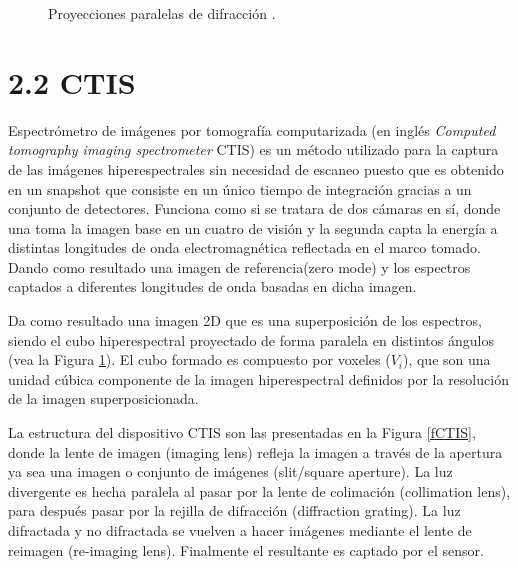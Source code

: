 \begin{figure}[h]
  \centering
  \centering
  \caption{Proyecciones paralelas de difracción \cite{PracCam}.}
  \label{fPaper1}
\end{figure}

\section{2.2 CTIS}
\label{CTIS}
Espectrómetro de imágenes por tomografía computarizada (en inglés \textit{Computed tomography imaging spectrometer} CTIS) es un método utilizado para la captura de las imágenes hiperespectrales sin necesidad de escaneo puesto que es obtenido en un snapshot que consiste en un único tiempo de integración gracias a un conjunto de detectores. 
Funciona como si se tratara de dos cámaras en sí, donde una toma la imagen base en un cuatro de visión y la segunda capta la energía a distintas longitudes de onda electromagnética reflectada en el marco tomado.
Dando como resultado una imagen de referencia(zero mode) y los espectros captados a diferentes longitudes de onda basadas en dicha imagen.

Da como resultado una imagen 2D que es una superposición de los espectros, siendo el cubo hiperespectral proyectado de forma paralela en distintos ángulos (vea la Figura \ref{fPaper1}). El cubo formado es compuesto por voxeles ($V_i$), que son una unidad cúbica componente de la imagen hiperespectral definidos por la resolución de la imagen superposicionada.   

La estructura del dispositivo CTIS son las presentadas en la Figura \ref{fCTIS}, donde la lente de imagen (imaging lens) refleja la imagen a través de la apertura ya sea una imagen o conjunto de imágenes (slit/square aperture). La luz divergente es hecha paralela al pasar por la lente de colimación (collimation lens), para después pasar por la rejilla de difracción (diffraction grating). La luz difractada y no difractada se vuelven a hacer imágenes mediante el lente de reimagen (re-imaging lens). Finalmente el resultante es captado por el sensor.

